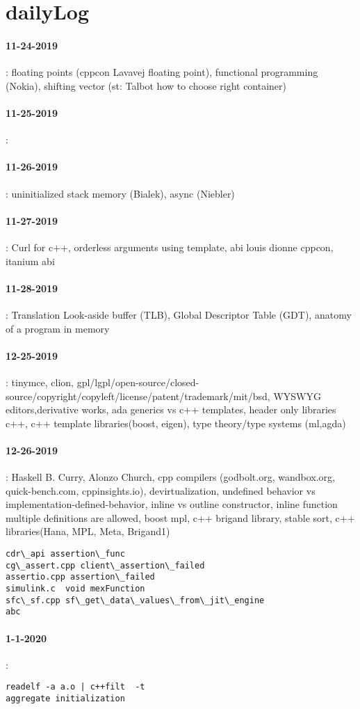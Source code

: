 \section{dailyLog} 
\paragraph{11-24-2019}: floating points (cppcon Lavavej floating point), functional programming (Nokia), shifting vector (st: Talbot how to choose right container)
\paragraph{11-25-2019}:
\paragraph{11-26-2019}: uninitialized stack memory (Bialek), async (Niebler) 
\paragraph{11-27-2019}: Curl for c++, orderless arguments using template, abi louis dionne cppcon, itanium abi
\paragraph{11-28-2019}: Translation Look-aside buffer (TLB), Global Descriptor Table (GDT), anatomy of a program in memory 
\paragraph{12-25-2019}: tinymce, clion, gpl/lgpl/open-source/closed-source/copyright/copyleft/license/patent/trademark/mit/bsd, WYSWYG editors,derivative works, ada generics vs c++ templates, header only libraries c++, c++ template libraries(boost, eigen), type theory/type systems
(ml,agda)
\paragraph{12-26-2019}: Haskell B. Curry, Alonzo Church, cpp compilers (godbolt.org, wandbox.org, quick-bench.com, cppinsights.io), devirtualization,
undefined behavior vs implementation-defined-behavior, inline vs outline constructor, inline function multiple definitions are allowed, 
boost mpl, c++ brigand library, stable sort, c++ libraries(Hana, MPL, Meta, Brigand1)
\begin{verbatim}
cdr\_api assertion\_func
cg\_assert.cpp client\_assertion\_failed 
assertio.cpp assertion\_failed
simulink.c  void mexFunction
sfc\_sf.cpp sf\_get\_data\_values\_from\_jit\_engine
abc
\end{verbatim}
\paragraph{1-1-2020}:
\begin{verbatim}
readelf -a a.o | c++filt  -t
aggregate initialization
\end{verbatim}


